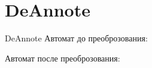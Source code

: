 \section{DeAnnote}
\begin{frame}{DeAnnote}
	Автомат до преоброзования:


	Автомат после преоброзования:


\end{frame}
